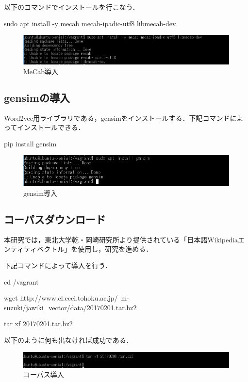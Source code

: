 以下のコマンドでインストールを行こなう．

sudo apt install -y mecab mecab-ipadic-utf8 libmecab-dev

\begin{figure}[htb]
\centering
\includegraphics[width=13cm]{4-25.png}
\caption{MeCab導入}\label{4-25}
\end{figure}
\newpage

\subsection{gensimの導入}

Word2vec用ライブラリである，gensimをインストールする．下記コマンドによってインストールできる．

pip install gensim

\begin{figure}[htb]
\centering
\includegraphics[width=13cm]{4-26.png}
\caption{gensim導入}\label{4-26}
\end{figure}
\newpage

\subsection{コーパスダウンロード}

本研究では，東北大学乾・岡崎研究所より提供されている「日本語Wikipediaエンティティベクトル」を使用し，研究を進める．

下記コマンドによって導入を行う．


cd /vagrant

wget http://www.cl.ecei.tohoku.ac.jp/~m-suzuki/jawiki\_vector/data/20170201.tar.bz2

tar xf 20170201.tar.bz2

以下のように何も出なければ成功である．

\begin{figure}[htb]
\centering
\includegraphics[width=13cm]{4-27.png}
\caption{コーパス導入}\label{4-27}
\end{figure}
\newpage

